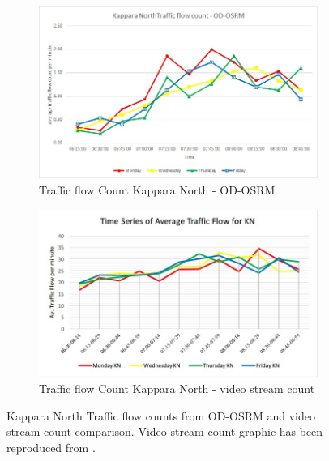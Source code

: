 \documentclass[12pt, a4paper]{report}
\theoremstyle{definition}
\theoremstyle{definition}%
\theoremstyle{definition}%
\theoremstyle{definition}%
\theoremstyle{definition}%
\theoremstyle{definition}%
\begin{document}
\begin{figure}[!] 
	\centering
	\begin{subfigure}{0.6\textwidth}
		\centering
		\includegraphics[width=\linewidth]{traffic_flow_count_KN_MINE.jpg} 
		\caption{\scriptsize{Traffic flow Count Kappara North - OD-OSRM}} 
		\label{fig:traffic_flow_count_KN_MINE}
	\end{subfigure}
	
	\vspace{1cm}
	\begin{subfigure}{0.6\textwidth}
		\centering
		\includegraphics[width=\linewidth]{traffic_flow_count_KN_Nigel_pace.jpg} 
		\caption{\scriptsize{Traffic flow Count Kappara North - video stream count}}
		\label{fig:traffic_flow_count_KN_NP}
	\end{subfigure}
	
	\caption{Kappara North Traffic flow counts from OD-OSRM and video stream count comparison. Video stream count graphic has been reproduced from \cite{Pace2017}.}
	\label{fig:kappara_north_traffic_flow_line_chart}
\end{figure}
\end{document}
